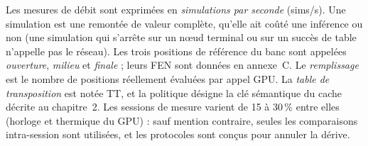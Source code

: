 Les mesures de d\'ebit sont exprim\'ees en \emph{simulations par seconde}
(sims/s). Une simulation est une remont\'ee de valeur compl\`ete, qu'elle ait
co\^ut\'e une inf\'erence ou non (une simulation qui s'arr\^ete sur un n\oe{}ud
terminal ou sur un succ\`es de table n'appelle pas le r\'eseau). Les trois
positions de r\'ef\'erence du banc sont appel\'ees \emph{ouverture},
\emph{milieu} et \emph{finale} ; leurs FEN sont donn\'ees en annexe~C. Le
\emph{remplissage} est le nombre de positions r\'eellement \'evalu\'ees par
appel GPU. La \emph{table de transposition} est not\'ee TT, et la politique
 d\'esigne la cl\'e s\'emantique du cache d\'ecrite au
chapitre~2. Les sessions de mesure varient de 15 \`a 30\,\% entre elles
(horloge et thermique du GPU) : sauf mention contraire, seules les
comparaisons intra-session sont utilis\'ees, et les protocoles sont con\c{c}us
pour annuler la d\'erive.

